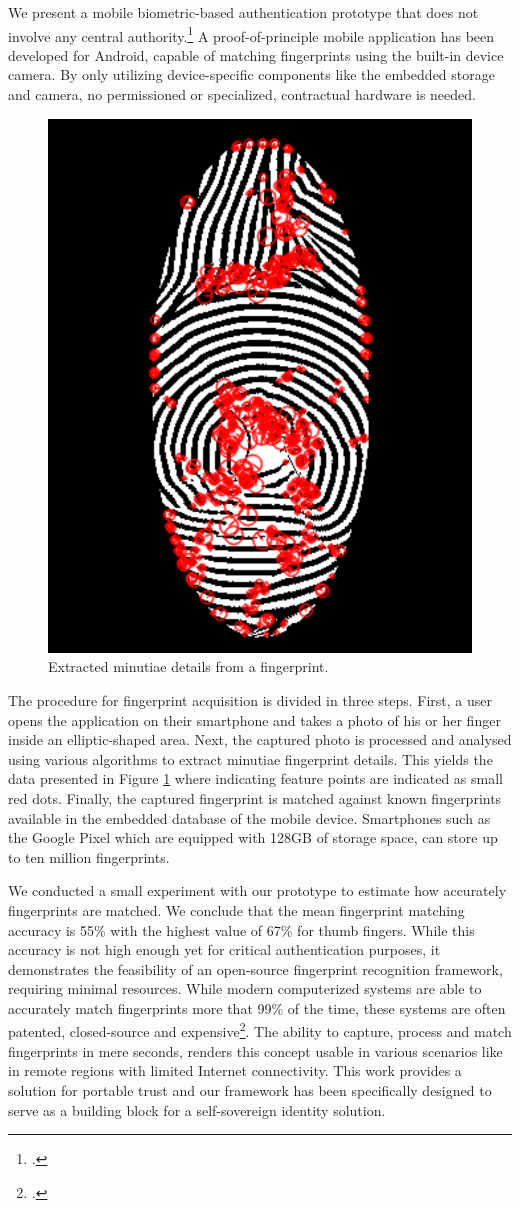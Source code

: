 \documentclass[USenglish]{article}
\begin{document}
We present a mobile biometric-based authentication prototype that does not involve any central authority.\footcite{hammudoglu2017portable}
A proof-of-principle mobile application has been developed for Android, capable of matching fingerprints using the built-in device camera.
By only utilizing device-specific components like the embedded storage and camera, no permissioned or specialized, contractual hardware is needed.

\begin{figure}[t]
	\centering
	\includegraphics[width=.5\columnwidth]{assets/fingerprint}
	\caption{Extracted minutiae details from a fingerprint.}
	\label{fig:fingerprint}
\end{figure}

The procedure for fingerprint acquisition is divided in three steps.
First, a user opens the application on their smartphone and takes a photo of his or her finger inside an elliptic-shaped area.
Next, the captured photo is processed and analysed using various algorithms to extract minutiae fingerprint details.
This yields the data presented in Figure \ref{fig:fingerprint} where indicating feature points are indicated as small red dots.
Finally, the captured fingerprint is matched against known fingerprints available in the embedded database of the mobile device.
Smartphones such as the Google Pixel which are equipped with 128GB of storage space, can store up to ten million fingerprints.

We conducted a small experiment with our prototype to estimate how accurately fingerprints are matched.
We conclude that the mean fingerprint matching accuracy is 55\% with the highest value of 67\% for thumb fingers.
While this accuracy is not high enough yet for critical authentication purposes, it demonstrates the feasibility of an open-source fingerprint recognition framework, requiring minimal resources.
While modern computerized systems are able to accurately match fingerprints more that 99\% of the time, these systems are often patented, closed-source and expensive\footcite{nistfingerprint}.
The ability to capture, process and match fingerprints in mere seconds, renders this concept usable in various scenarios like in remote regions with limited Internet connectivity.
This work provides a solution for portable trust and our framework has been specifically designed to serve as a building block for a self-sovereign identity solution.
\end{document}
